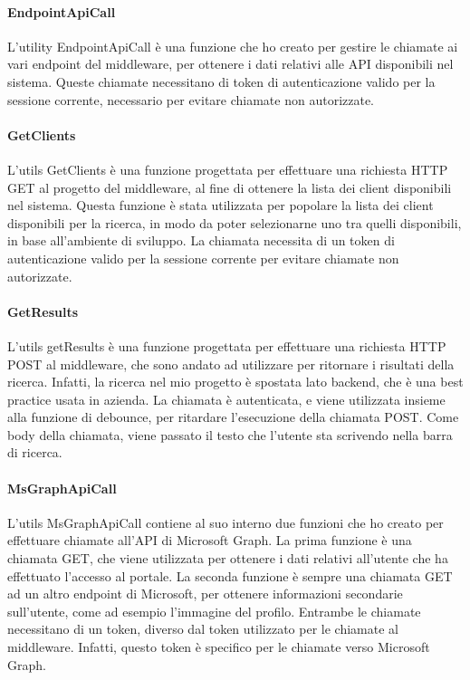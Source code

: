 \paragraph{EndpointApiCall}\label{par:endpoint-api-call}
L'utility EndpointApiCall è una funzione che ho creato per gestire le chiamate ai vari endpoint del middleware, per ottenere
i dati relativi alle API disponibili nel sistema.
Queste chiamate necessitano di token di autenticazione valido per la sessione corrente, necessario per evitare chiamate non autorizzate.

\paragraph{GetClients}\label{par:get-clients}
L'utils GetClients è una funzione progettata per effettuare una richiesta HTTP GET al progetto del middleware, al fine di
ottenere la lista dei client disponibili nel sistema. Questa funzione è stata utilizzata per popolare la lista dei client disponibili
per la ricerca, in modo da poter selezionarne uno tra quelli disponibili, in base all'ambiente di sviluppo.
La chiamata necessita di un token di autenticazione valido per la sessione corrente per evitare chiamate non autorizzate.

\paragraph{GetResults}\label{par:get-results}
L'utils getResults è una funzione progettata per effettuare una richiesta HTTP POST al middleware, che sono andato ad utilizzare per ritornare 
i risultati della ricerca. Infatti, la ricerca nel mio progetto è spostata lato backend, che è una best practice usata in azienda.
La chiamata è autenticata, e viene utilizzata insieme alla funzione di debounce, per ritardare l'esecuzione della chiamata POST. Come body della chiamata,
viene passato il testo che l'utente sta scrivendo nella barra di ricerca.

\paragraph{MsGraphApiCall}\label{par:ms-graph-api-call}
L'utils MsGraphApiCall contiene al suo interno due funzioni che ho creato per effettuare chiamate all'API di Microsoft Graph. 
La prima funzione è una chiamata GET, che viene utilizzata per ottenere i dati relativi all'utente che ha effettuato l'accesso al portale.
La seconda funzione è sempre una chiamata GET ad un altro endpoint di Microsoft, per ottenere informazioni secondarie sull'utente, come ad esempio l'immagine del profilo.
Entrambe le chiamate necessitano di un token, diverso dal token utilizzato per le chiamate al middleware. Infatti, questo token è specifico per le chiamate verso Microsoft Graph.

